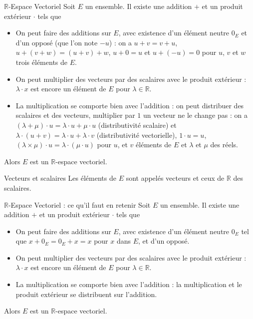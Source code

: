 \documentclass{classe}
\begin{document}
\begin{définition}{$\mathbb{R}$-Espace Vectoriel}{}
	Soit $E$ un ensemble. Il existe une addition $+$ et un produit extérieur $\cdot$ tels que
	\begin{itemize}
		\item On peut faire des additions sur $E$, avec existence d'un élément neutre $0_E$ et d'un opposé (que l'on note $-u$) : on a $u+v = v+u$, $u+(v+w) = (u+v)+w$, $u+0=u$ et $u + (-u) = 0$ pour $u$, $v$ et $w$ trois éléments de $E$.
		\item On peut multiplier des vecteurs par des scalaires avec le produit extérieur : $\lambda\cdot x$ est encore un élément de $E$ pour $\lambda \in \mathbb{R}$.
		\item La multiplication se comporte bien avec l'addition : on peut distribuer des scalaires et des vecteurs, multiplier par $1$ un vecteur ne le change pas : on a $(\lambda + \mu)\cdot u = \lambda\cdot u + \mu\cdot u$ (distributivité scalaire) et $\lambda\cdot (u+v) = \lambda \cdot u+\lambda\cdot v$ (distributivité vectorielle), $1\cdot u = u$, $(\lambda\times\mu)\cdot u = \lambda\cdot (\mu\cdot u)$ pour $u$, et $v$ éléments de $E$ et $\lambda$ et $\mu$ des réels.
	\end{itemize}
	Alors $E$ est un $\mathbb{R}$-espace vectoriel.
\end{définition}

\begin{définition}{Vecteurs et scalaires}{}
	Les éléments de $E$ sont appelés vecteurs et ceux de $\mathbb{R}$ des scalaires.
\end{définition}

\begin{définition}{$\mathbb{R}$-Espace Vectoriel : ce qu'il faut en retenir}{}
	Soit $E$ un ensemble. Il existe une addition $+$ et un produit extérieur $\cdot$ tels que
	\begin{itemize}
		\item On peut faire des additions sur $E$, avec existence d'un élément neutre $0_E$ tel que $x + 0_E = 0_E + x = x$ pour $x$ dans $E$, et d'un opposé.
		\item On peut multiplier des vecteurs par des scalaires avec le produit extérieur : $\lambda\cdot x$ est encore un élément de $E$ pour $\lambda \in \mathbb{R}$.
		\item La multiplication se comporte bien avec l'addition : la multiplication et le produit extérieur se distribuent sur l'addition.
	\end{itemize}
	Alors $E$ est un $\mathbb{R}$-espace vectoriel.
\end{définition}
\end{document}
